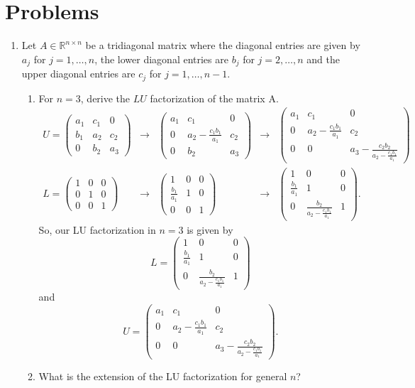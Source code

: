 \documentclass[a4paper,12pt]{article}
\newcommand{\reals}{\mathbb{R}}
\newcommand{\pmat}[1]{\begin{pmatrix} #1 \end{pmatrix}}
\begin{document}
\section*{Problems}
\begin{enumerate}[label = \arabic*.]
	\item Let $ A \in \reals^{n \times n} $ be a tridiagonal matrix where the diagonal entries are given by $ a_j $ for $ j = 1, \ldots, n $, the lower diagonal entries are $ b_j $ for $ j = 2, \ldots, n $ and the upper diagonal entries are $ c_j $ for $ j = 1, \ldots, n-1 $.
	\begin{enumerate}[label = (\alph*)]
		\item For $ n = 3 $, derive the $ LU $ factorization of the matrix A.
		\[
			\begin{array}{ccccc}
				U = \pmat{a_1 & c_1 & 0 \\ b_1 & a_2 & c_2 \\ 0 & b_2 & a_3} & \to & \pmat{a_1 & c_1 & 0 \\ 0 & a_2 - \frac{c_1 b_1}{a_1} & c_2 \\ 0 & b_2 & a_3} & \to & \pmat{a_1 & c_1 & 0 \\ 0 & a_2 - \frac{c_1 b_1}{a_1} & c_2 \\ 0 & 0 & a_3 - \frac{c_2 b_2}{a_2 - \frac{c_1 b_1}{a_1}}} \\
				L = \pmat{1 & 0 & 0 \\ 0 & 1 & 0 \\ 0 & 0 & 1} & \to & \pmat{1 & 0 & 0 \\ \frac{b_1}{a_1} & 1 & 0 \\ 0 & 0 & 1} & \to & \pmat{1 & 0 & 0 \\ \frac{b_1}{a_1} & 1 & 0 \\ 0 & \frac{b_2}{a_2 - \frac{c_1 b_1}{a_1}} & 1}.
			\end{array}
		\]
		So, our LU factorization in $ n = 3 $ is given by 
		\[
			L = \pmat{1 & 0 & 0 \\ \frac{b_1}{a_1} & 1 & 0 \\ 0 & \frac{b_2}{a_2 - \frac{c_1 b_1}{a_1}} & 1}
		\]
		and
		\[
			U = \pmat{a_1 & c_1 & 0 \\ 0 & a_2 - \frac{c_1 b_1}{a_1} & c_2 \\ 0 & 0 & a_3 - \frac{c_2 b_2}{a_2 - \frac{c_1 b_1}{a_1}}}.
		\]
		
		\item What is the extension of the LU factorization for general $ n $?
		

\end{enumerate}
\end{enumerate}
\end{document}
